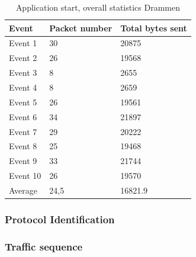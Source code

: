 \begin{table}[H]
\centering
\caption{Application start, overall statistics Drammen}
\label{tab:ASoverallDRA}
\begin{tabular}{|l|l|l|}
\hline
\textbf{Event} & \textbf{Packet number} & \textbf{Total bytes sent} \\ \hline
Event 1        & 30                     & 20875                     \\ \hline
Event 2        & 26                     & 19568                     \\ \hline
Event 3        & 8                      & 2655                      \\ \hline
Event 4        & 8                      & 2659                      \\ \hline
Event 5        & 26                     & 19561                     \\ \hline
Event 6        & 34                     & 21897                     \\ \hline
Event 7        & 29                     & 20222                     \\ \hline
Event 8        & 25                     & 19468                     \\ \hline
Event 9        & 33                     & 21744                     \\ \hline
Event 10       & 26                     & 19570                     \\ \hline
Average        & 24,5                   & 16821.9                   \\ \hline
\end{tabular}
\end{table}

\subsubsection{Protocol Identification}

\subsubsection{Traffic sequence}

